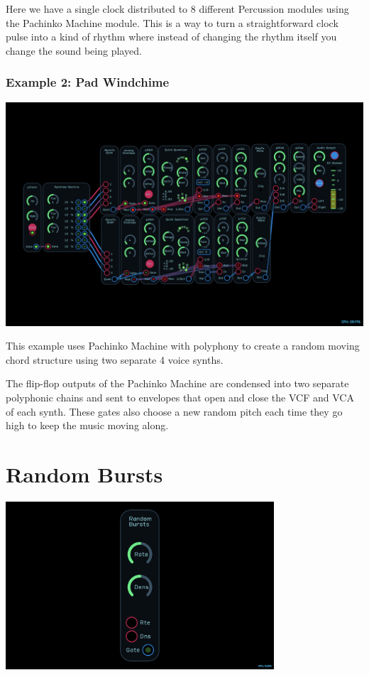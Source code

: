 \documentclass[11pt]{book}
\begin{document}
\begin{multicols*}{2}
Here we have a single clock distributed to 8 different Percussion modules using the Pachinko Machine module. This is a way to turn a straightforward clock pulse into a kind of rhythm where instead of changing the rhythm itself you change the sound being played.

\subsubsection*{Example 2: Pad Windchime}

\begin{center}
\includegraphics[width=0.95\linewidth]{pachinko-machine-fig7.png}
\end{center}

This example uses Pachinko Machine with polyphony to create a random moving chord structure using two separate 4 voice synths.

The flip-flop outputs of the Pachinko Machine are condensed into two separate polyphonic chains and sent to envelopes that open and close the VCF and VCA of each synth. These gates also choose a new random pitch each time they go high to keep the music moving along.

\end{multicols*}

\pagebreak


\section{Random Bursts}

\begin{center}
\includegraphics[width=0.75\textwidth]{random-bursts.png}
\end{center}
\end{document}
